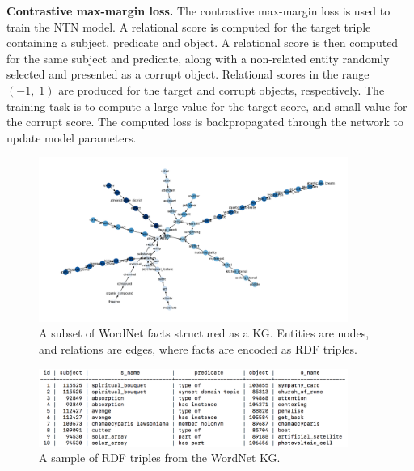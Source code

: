 \noindent \textbf{Contrastive max-margin loss.} The contrastive max-margin loss is used to train the NTN model. A relational score is computed for the target triple containing a subject, predicate and object. A relational score is then computed for the same subject and predicate, along with a non-related entity randomly selected and presented as a corrupt object. Relational scores in the range $ (-1, \; 1) $ are produced for the target and corrupt objects, respectively. The training task is to compute a large value for the target score, and small value for the corrupt score. The computed loss is backpropagated through the network to update model parameters. \par

\begin{figure}[H]
   	\centering
    	\includegraphics[width=0.9\textwidth, height=0.5\textwidth]{Wordnet}
	\caption{A subset of WordNet facts structured as a KG. Entities are nodes, and relations are edges, where facts are encoded as RDF triples.}
\end{figure}

\begin{figure}[H]
   	\centering
    	\includegraphics[width=0.9\textwidth, height=0.2\textwidth]{wordnet_fact_sample}
	\caption{A sample of RDF triples from the WordNet KG.}
\end{figure}

